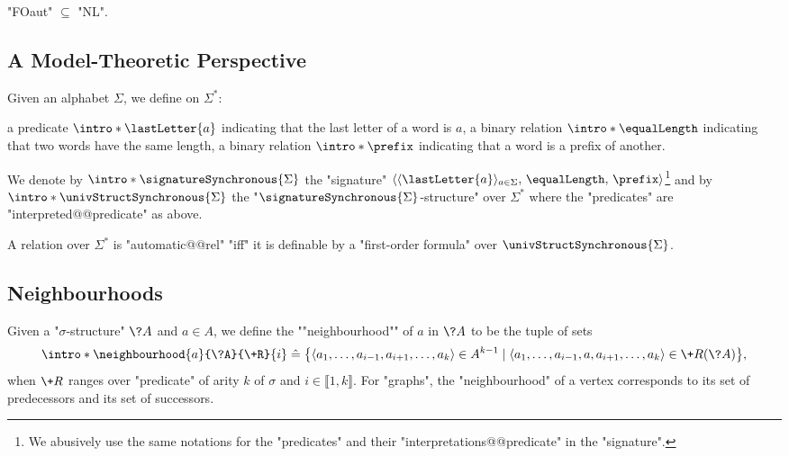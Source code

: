 \begin{proposition}
	"FOaut" $\subseteq$ "NL".
\end{proposition}


\subsection{A Model-Theoretic Perspective}

Given an alphabet $\Sigma$, we define on $\Sigma^*$:
\begin{itemize}
	\itemAP a predicate $\intro*\lastLetter{a}$ indicating that the last letter of a word is $a$,
	\itemAP a binary relation $\intro*\equalLength$ indicating that two words have the same length,
	\itemAP a binary relation $\intro*\prefix$ indicating that a word is a prefix of another.
\end{itemize} 
We denote by $\intro*\signatureSynchronous{\Sigma}$ the "signature" $\langle \langle\lastLetter{a}\rangle_{a \in \Sigma},\, \equalLength,\, \prefix \rangle$\footnote{We abusively use the same notations for
the "predicates" and their "interpretations@@predicate" in the "signature".} and
by \AP$\intro*\univStructSynchronous{\Sigma}$ the "$\signatureSynchronous{\Sigma}$-structure" over $\Sigma^*$ where
the "predicates" are "interpreted@@predicate" as above.

\begin{proposition}
	\label{prop:automatic-first-order}
	A relation over $\Sigma^*$ is "automatic@@rel" "iff" it is definable by a "first-order formula" over \(\univStructSynchronous{\Sigma}\).
\end{proposition}

\subsection{Neighbourhoods}

Given a "$\sigma$-structure" $\?A$ and $a \in A$, we define the \AP""neighbourhood"" of $a$
in $\?A$
to be the tuple of sets
\[
	\intro*\neighbourhood{a}{\?A}{\+R}{i} \defeq
		\big\{
			\langle a_1, \hdots, a_{i-1}, a_{i+1}, \hdots, a_k \rangle \in A^{k-1} \mid
			\langle a_1, \hdots, a_{i-1}, a, a_{i+1}, \hdots, a_k \rangle \in \+R(\?A)
		\big\},
\]
when $\+R$ ranges over "predicate" of arity $k$ of $\sigma$ and $i \in \lBrack 1,k\rBrack$. 
For "graphs", the "neighbourhood" of a vertex corresponds to its set of predecessors and
its set of successors.

